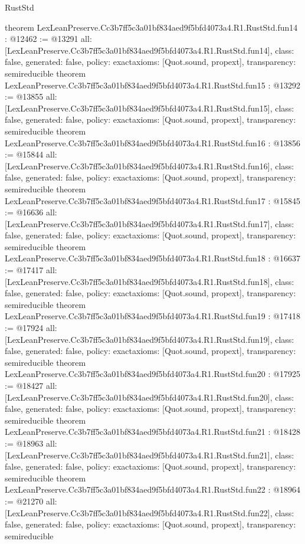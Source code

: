 \begin{lexlean}{RustStd}
\begin{coremodule}
{}
theorem LexLeanPreserve.Cc3b7ff5c3a01bf834aed9f5bfd4073a4.R1.RustStd.fun14 : @12462 := @13291 {
  all: [LexLeanPreserve.Cc3b7ff5c3a01bf834aed9f5bfd4073a4.R1.RustStd.fun14],
  class: false,
  generated: false,
  policy: exact{axioms: [Quot.sound, propext]},
  transparency: semireducible
}
theorem LexLeanPreserve.Cc3b7ff5c3a01bf834aed9f5bfd4073a4.R1.RustStd.fun15 : @13292 := @13855 {
  all: [LexLeanPreserve.Cc3b7ff5c3a01bf834aed9f5bfd4073a4.R1.RustStd.fun15],
  class: false,
  generated: false,
  policy: exact{axioms: [Quot.sound, propext]},
  transparency: semireducible
}
theorem LexLeanPreserve.Cc3b7ff5c3a01bf834aed9f5bfd4073a4.R1.RustStd.fun16 : @13856 := @15844 {
  all: [LexLeanPreserve.Cc3b7ff5c3a01bf834aed9f5bfd4073a4.R1.RustStd.fun16],
  class: false,
  generated: false,
  policy: exact{axioms: [Quot.sound, propext]},
  transparency: semireducible
}
theorem LexLeanPreserve.Cc3b7ff5c3a01bf834aed9f5bfd4073a4.R1.RustStd.fun17 : @15845 := @16636 {
  all: [LexLeanPreserve.Cc3b7ff5c3a01bf834aed9f5bfd4073a4.R1.RustStd.fun17],
  class: false,
  generated: false,
  policy: exact{axioms: [Quot.sound, propext]},
  transparency: semireducible
}
theorem LexLeanPreserve.Cc3b7ff5c3a01bf834aed9f5bfd4073a4.R1.RustStd.fun18 : @16637 := @17417 {
  all: [LexLeanPreserve.Cc3b7ff5c3a01bf834aed9f5bfd4073a4.R1.RustStd.fun18],
  class: false,
  generated: false,
  policy: exact{axioms: [Quot.sound, propext]},
  transparency: semireducible
}
theorem LexLeanPreserve.Cc3b7ff5c3a01bf834aed9f5bfd4073a4.R1.RustStd.fun19 : @17418 := @17924 {
  all: [LexLeanPreserve.Cc3b7ff5c3a01bf834aed9f5bfd4073a4.R1.RustStd.fun19],
  class: false,
  generated: false,
  policy: exact{axioms: [Quot.sound, propext]},
  transparency: semireducible
}
theorem LexLeanPreserve.Cc3b7ff5c3a01bf834aed9f5bfd4073a4.R1.RustStd.fun20 : @17925 := @18427 {
  all: [LexLeanPreserve.Cc3b7ff5c3a01bf834aed9f5bfd4073a4.R1.RustStd.fun20],
  class: false,
  generated: false,
  policy: exact{axioms: [Quot.sound, propext]},
  transparency: semireducible
}
theorem LexLeanPreserve.Cc3b7ff5c3a01bf834aed9f5bfd4073a4.R1.RustStd.fun21 : @18428 := @18963 {
  all: [LexLeanPreserve.Cc3b7ff5c3a01bf834aed9f5bfd4073a4.R1.RustStd.fun21],
  class: false,
  generated: false,
  policy: exact{axioms: [Quot.sound, propext]},
  transparency: semireducible
}
theorem LexLeanPreserve.Cc3b7ff5c3a01bf834aed9f5bfd4073a4.R1.RustStd.fun22 : @18964 := @21270 {
  all: [LexLeanPreserve.Cc3b7ff5c3a01bf834aed9f5bfd4073a4.R1.RustStd.fun22],
  class: false,
  generated: false,
  policy: exact{axioms: [Quot.sound, propext]},
  transparency: semireducible
}
\end{coremodule}
\end{lexlean}
